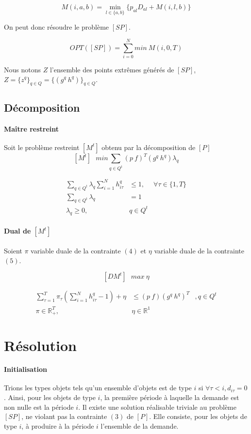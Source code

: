 \documentclass[12pt,a4paper]{article}
\begin{document}
	 $$ M(i,a,b) =  \min_{l \in \{a,b\}} \{ p_{al}D_{al} + M(i,l,b) \} $$
	 
	 On peut donc résoudre le problème $[SP]$.
	 
	 $$ OPT([SP]) = \sum_{i=0}^N min~M(i,0,T) $$
	
	Nous notons $Z$ l'ensemble des points extrêmes générés de $[SP]$, $Z=\{z^q\}_{q\in Q} = \{ (g^q~h^q) \}_{q\in Q}$.
	
\subsection*{Décomposition}
\paragraph{Maître restreint} Soit le problème restreint $[M^t]$ obtenu par la décomposition de $[P]$
 	$$ [M^t] ~~~ min \sum_{q \in Q^t} (p~f)^T(g^q~h^q)\lambda_q $$	
 	
	\begin{eqnarray}	
 		\sum_{q \in Q^t} \lambda_q \sum_{i=1}^N h_{i\tau}^q &\leq 1, & \forall \tau \in \{1,T\} \\
 		\sum_{q \in Q^t} \lambda_q &=1 & \\
 		\lambda_q \geq 0,& q \in Q^t & \nonumber
 	\end{eqnarray}
 	
\newpage 
\paragraph{Dual de $[M^t]$} Soient $\pi$ variable duale de la contrainte $(4)$ et $\eta$ variable duale de la contrainte $(5)$.

$$ [DM^t] ~~~ max ~ \eta $$	

\begin{eqnarray}	
 		\sum_{\tau=1}^T \pi_{\tau} \left( \sum_{i=1}^N h_{i\tau}^q -1 \right) + \eta &\leq (p~f)(g^q~h^q)^T  &, q\in Q^t\\
 		\pi \in \mathbb{R}^T_+,& \eta \in \mathbb{R}^1 \nonumber
 \end{eqnarray}
 	

\section*{Résolution}	

\paragraph{Initialisation} Trions les types objets tels qu'un ensemble d'objets est de type $i$ si $\forall \tau < i , d_{i\tau} = 0$. Ainsi, pour les objets de type $i$, la première période à laquelle la demande est non nulle est la période $i$. \medbreak
 Il existe une solution réalisable triviale au problème $[SP]$, ne violant pas la contrainte $(3)$ de $[P]$. Elle consiste, pour les objets de type $i$, à produire à la période $i$ l'ensemble de la demande.
 
\end{document}
